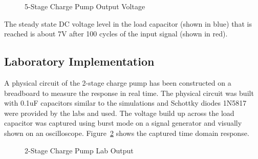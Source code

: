 \documentclass[12pt]{article}
\begin{document}
\begin{figure}[H]
\caption{5-Stage Charge Pump Output Voltage}
\label{fig:5SCPSim}
\end{figure}

The steady state DC voltage level in the load capacitor (shown in blue) that is reached is about 7V after 100 cycles of the input signal (shown in red).

\subsection{Laboratory Implementation}

\noindent A physical circuit of the 2-stage charge pump has been constructed on a breadboard to measure the response in real time. The physical circuit was built with 0.1uF capacitors similar to the simulations and Schottky diodes 1N5817 were provided by the labs and used. The voltage build up across the load capacitor was captured using burst mode on a signal generator and visually shown on an oscilloscope. Figure~\ref{fig:2SCPLabOut} shows the captured time domain response.

\begin{figure}[H]
\caption{2-Stage Charge Pump Lab Output}
\label{fig:2SCPLabOut}
\end{figure}
\end{document}
